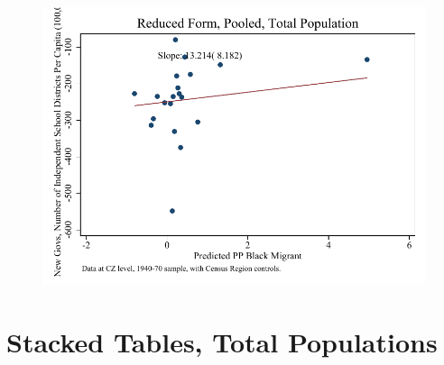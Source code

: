 \documentclass{article}
\begin{document}
\begin{figure}
\centering
\includegraphics{figures/simplefigs/pooled_schdist_ind_pc_C3_total_rf.pdf}
\end{figure}
\clearpage


\section{Stacked Tables, Total Populations}
\end{document}
